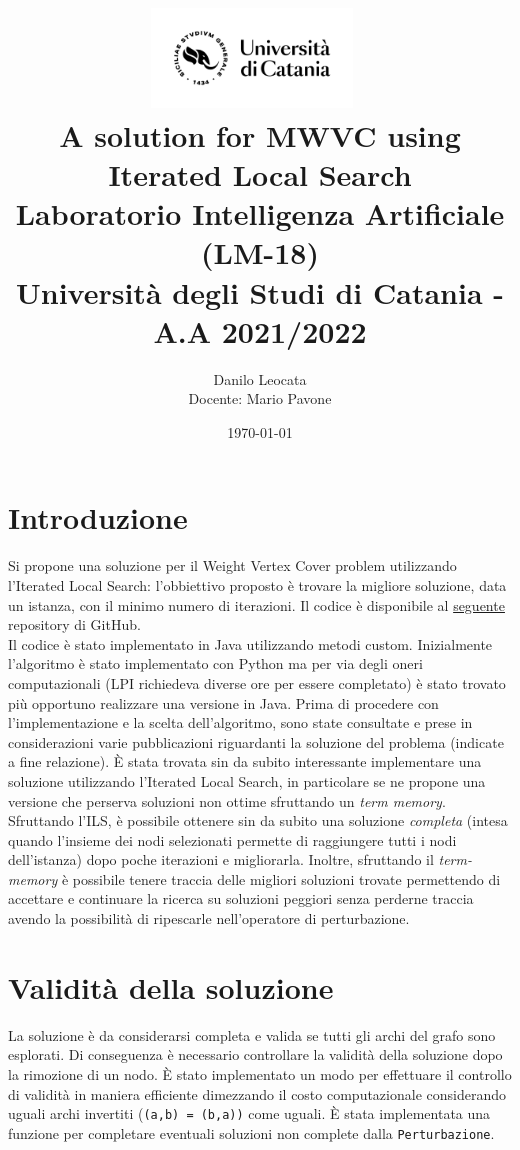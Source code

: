 \documentclass[11pt]{article}
\title{ %
\includegraphics[width=0.4\textwidth]{UniCT-Logo-Nero}~\\
A solution for MWVC using Iterated Local Search \\ 
\large Laboratorio Intelligenza Artificiale (LM-18) \\ Università degli Studi di Catania - A.A 2021/2022 \\
}
\author{ Danilo Leocata \\ Docente: Mario Pavone}
\date{\today}
\begin{document}
\maketitle	
\pagebreak



\section{Introduzione}

Si propone una soluzione per il Weight Vertex Cover problem utilizzando l'Iterated Local Search: l'obbiettivo proposto è trovare la migliore soluzione, data un istanza, con il minimo numero di iterazioni. Il codice è disponibile al \href{https://github.com/khalld/mwvc-using-ils-java}{seguente} repository di GitHub. \\
Il codice è stato implementato in Java utilizzando metodi custom. Inizialmente l'algoritmo è stato implementato con Python ma per via degli oneri computazionali (LPI richiedeva diverse ore per essere completato) è stato trovato più opportuno realizzare una versione in Java.
Prima di procedere con l'implementazione e la scelta dell'algoritmo, sono state consultate e prese in considerazioni varie pubblicazioni riguardanti la soluzione del problema (indicate a fine relazione). È stata trovata sin da subito interessante implementare una soluzione utilizzando l'Iterated Local Search, in particolare se ne propone una versione che perserva soluzioni non ottime sfruttando un \textit{term memory}.
Sfruttando l'ILS, è possibile ottenere sin da subito una soluzione \textit{completa} (intesa quando l'insieme dei nodi selezionati permette di raggiungere tutti i nodi dell'istanza) dopo poche iterazioni e migliorarla. Inoltre, sfruttando il \textit{term-memory} è possibile tenere traccia delle migliori soluzioni trovate permettendo di accettare e continuare la ricerca su soluzioni peggiori senza perderne traccia avendo la possibilità di ripescarle nell'operatore di perturbazione.

\pagebreak


\section{Validità della soluzione}

La soluzione è da considerarsi completa e valida se tutti gli archi del grafo sono esplorati. Di conseguenza è necessario controllare la validità della soluzione dopo la rimozione di un nodo.
È stato implementato un modo per effettuare il controllo di validità in maniera efficiente dimezzando il costo computazionale considerando uguali archi invertiti (\verb|(a,b) = (b,a))| come uguali.
È stata implementata una funzione per completare eventuali soluzioni non complete dalla \texttt{Perturbazione}.
\end{document}
